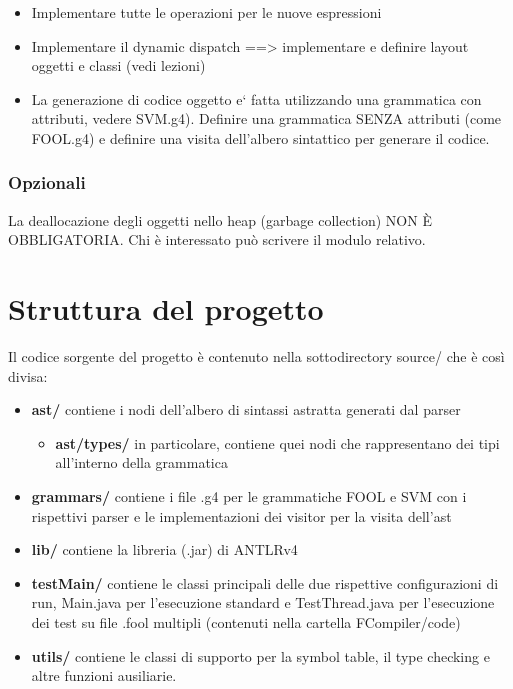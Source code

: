 \documentclass[a4paper]{article}   %
\begin{document}
\begin{itemize}
  \item Implementare tutte le operazioni per le nuove espressioni
  \item Implementare il dynamic dispatch ==> implementare e definire layout oggetti e classi
(vedi lezioni)
  \item La generazione di codice oggetto e` fatta utilizzando una grammatica con attributi,
vedere SVM.g4).
Definire una grammatica SENZA attributi (come FOOL.g4) e definire una visita
dell'albero sintattico per generare il codice.
\end{itemize}

\subsubsection{Opzionali}

La deallocazione degli oggetti nello heap (garbage collection) NON È OBBLIGATORIA.
Chi è interessato può scrivere il modulo relativo.



\section{Struttura del progetto}

Il codice sorgente del progetto è contenuto nella sottodirectory source/ che è così divisa:

\begin{itemize}
  \item \textbf{ast/} contiene i nodi dell'albero di sintassi astratta generati dal parser
  \begin{itemize}
    \item \textbf{ast/types/}
    in particolare, contiene quei nodi che rappresentano dei tipi all'interno della grammatica
  \end{itemize}
  \item \textbf{grammars/}
    contiene i file .g4 per le grammatiche FOOL e SVM con i rispettivi parser e le implementazioni dei visitor per la visita dell'ast
  \item \textbf{lib/}
    contiene la libreria (.jar) di ANTLRv4
  \item \textbf{testMain/}
    contiene le classi principali delle due rispettive configurazioni di run, Main.java per l'esecuzione standard
    e TestThread.java per l'esecuzione dei test su file .fool multipli (contenuti nella cartella FCompiler/code)
  \item \textbf{utils/}
    contiene le classi di supporto per la symbol table, il type checking e altre funzioni ausiliarie.

\end{itemize}
\end{document}
